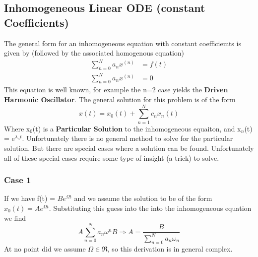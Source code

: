 \documentclass{article}
\newcommand{\be}{\begin{equation}}
\newcommand{\ee}{\end{equation}}
\begin{document}
\subsection*{Inhomogeneous Linear ODE (constant Coefficients)}
The general form for an inhomogeneous equation with constant coefficiemts is given by (followed by the associated homogenous equation)
\be
\begin{split}
	\sum_{n=0}^N a_n x^{(n)} &= f(t)\\
	\sum_{n=0}^N a_n x^{(n)} &= 0
\end{split}
\ee
This equation is well known, for example the n=2 case yields the \textbf{Driven Harmonic Oscillator}.
The general solution for this problem is of the form
\be
x(t) = x_0(t) + \sum_{n=1}^N c_nx_n(t)
\ee
Where x$_0$(t) is a \textbf{Particular Solution} to the inhomogeneous equaiton, and x$_n$(t) = e$^{\lambda_n t}$. 
Unfortunately there is no general method to solve for the particular solution.
But there are special cases where a solution can be found.
Unfortunately all of these special cases require some type of insight (a trick) to solve.

\subsubsection*{Case 1}
If we have f(t) = $Be^{\Omega t}$ and we assume the solution to be of the form $x_0(t) = Ae^{\Omega t}$.
Substituting this guess into the into the inhomogeneous equation we find
\be
A \sum_{n=0}^N a_n \omega^n B \Rightarrow A = \frac{B}{\sum_{n=0}^N a_n \omega_n}
\ee
At no point did we assume $\Omega \in \Re$, so this derivation is in general complex.
\end{document}
